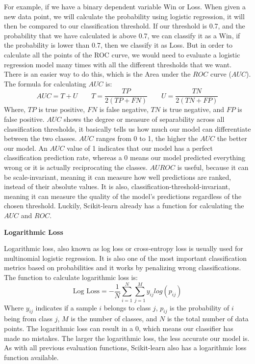 \documentclass[a4paper,12pt]{report}
\newcommand{\msection}[1]{\noindent\textbf{#1}}
\begin{document}
For example, if we have a binary dependent variable Win or Loss. When given a new data point, we will calculate the probability using logistic regression, it will then be compared to our classification threshold. If our threshold is 0.7, and the probability that we have calculated is above 0.7, we can classify it as a Win, if the probability is lower than 0.7, then we classify it as Loss. But in order to calculate all the points of the ROC curve, we would need to evaluate a logistic regression model many times with all the different thresholds that we want. There is an easier way to do this, which is the Area under the $ROC$ curve ($AUC$). The formula for calculating $AUC$ is:
$$AUC=T+U\qquad T=\frac{TP}{2(TP+FN)}\qquad U=\frac{TN}{2(TN+FP)}$$
Where, $TP$ is true positive, $FN$ is false negative, $TN$ is true negative, and $FP$ is false positive. $AUC$ shows the degree or measure of separability across all classification thresholds, it basically tells us how much our model can differentiate between the two classes. $AUC$ ranges from 0 to 1, the higher the $AUC$ the better our model. An $AUC$ value of 1 indicates that our model has a perfect classification prediction rate, whereas a 0 means our model predicted everything wrong or it is actually reciprocating the classes. $AUROC$ is useful, because it can be scale-invariant, meaning it can measure how well predictions are ranked, instead of their absolute values. It is also, classification-threshold-invariant, meaning it can measure the quality of the model’s predictions regardless of the chosen threshold. Luckily, Scikit-learn already has a function for calculating the $AUC$ and $ROC$.     

\msection{Logarithmic Loss}

Logarithmic loss, also known as log loss or cross-entropy loss is usually used for multinomial logistic regression. It is also one of the most important classification metrics based on probabilities and it works by penalizing wrong classifications. The function to calculate logarithmic loss is:
$$\text{Log Loss} = -\frac{1}{N}\sum_{i=1}^N\sum_{j=1}^My_{ij}log(p_{ij})$$
Where $y_{ij}$ indicates if a sample $i$ belongs to class $j$, $p_{ij}$ is the probability of $i$ being from class $j$, $M$ is the number of classes, and $N$ is the total number of data points. The logarithmic loss can result in a 0, which means our classifier has made no mistakes. The larger the logarithmic loss, the less accurate our model is. As with all previous evaluation functions, Scikit-learn also has a logarithmic loss function available.
\end{document}

